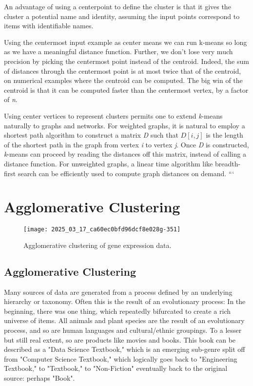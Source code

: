 \documentclass[10pt]{article}
\begin{document}
An advantage of using a centerpoint to define the cluster is that it gives the cluster a potential name and identity, assuming the input points correspond to items with identifiable names.

Using the centermost input example as center means we can run k-means so long as we have a meaningful distance function. Further, we don’t lose very much precision by picking the centermost point instead of the centroid. Indeed, the sum of distances through the centermost point is at most twice that of the centroid, on numerical examples where the centroid can be computed. The big win of the centroid is that it can be computed faster than the centermost vertex, by a factor of \textit{n}.

Using center vertices to represent clusters permits one to extend \textit{k}-means naturally to graphs and networks. For weighted graphs, it is natural to employ a shortest path algorithm to construct a matrix \textit{D} such that \(D[i, j]\) is the length of the shortest path in the graph from vertex \textit{i} to vertex \textit{j}. Once \textit{D} is constructed, \textit{k}-means can proceed by reading the distances off this matrix, instead of calling a distance function. For unweighted graphs, a linear time algorithm like breadth-first search can be efficiently used to compute graph distances on demand.
```

\section{Agglomerative Clustering}

\begin{figure}[H]
    \centering
    \texttt{[image: 2025\_03\_17\_ca60ec0bfd96dcf8e028g-351]}
    \caption{Agglomerative clustering of gene expression data.}
    \label{fig:agglomerative_clustering}
\end{figure}

\subsection{Agglomerative Clustering}

Many sources of data are generated from a process defined by an underlying hierarchy or taxonomy. Often this is the result of an evolutionary process: In the beginning, there was one thing, which repeatedly bifurcated to create a rich universe of items. All animals and plant species are the result of an evolutionary process, and so are human languages and cultural/ethnic groupings. To a lesser but still real extent, so are products like movies and books. This book can be described as a "Data Science Textbook," which is an emerging sub-genre split off from "Computer Science Textbook," which logically goes back to "Engineering Textbook," to "Textbook," to "Non-Fiction" eventually back to the original source: perhaps "Book".
\end{document}
